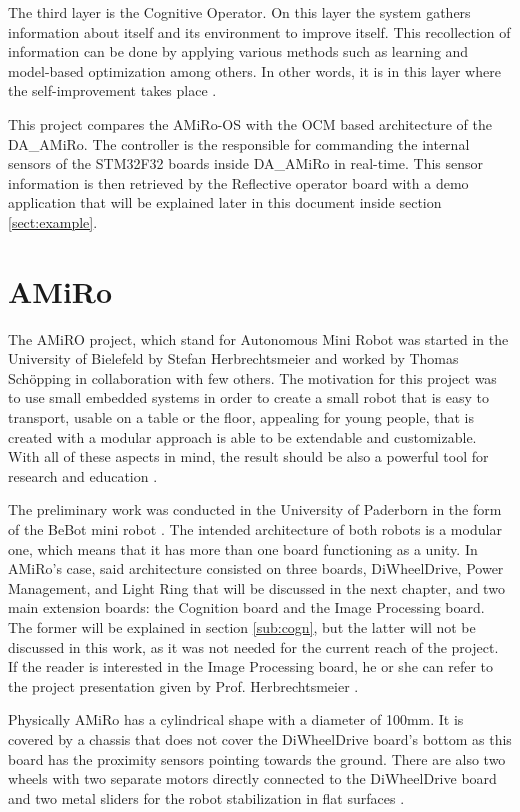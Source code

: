 \documentclass[12pt]{report}%
\begin{document}
The third layer is the Cognitive Operator. On this layer the system gathers information about itself and its environment to improve itself. This recollection of information can be done by applying various methods such as learning and model-based optimization among others. In other words, it is in this layer where the self-improvement takes place \cite{ocmAuto}.

This project compares the AMiRo-OS with the OCM based architecture of the DA\_AMiRo. The controller is the responsible for commanding the internal sensors of the STM32F32 boards inside DA\_AMiRo in real-time. This sensor information is then retrieved by the Reflective operator board with a demo application that will be explained later in this document inside section \ref{sect:example}.

\section{AMiRo}
The AMiRO project, which stand for Autonomous Mini Robot was started in the University of Bielefeld by Stefan Herbrechtsmeier and worked by Thomas Schöpping in collaboration with few others. The motivation for this project was to use small embedded systems in order to create a small robot that is easy to transport, usable on a table or the floor, appealing for young people, that is created with a modular approach is able to be extendable and customizable. With all of these aspects in mind, the result should be also a powerful tool for research and education \cite{AMiRo_ppt_v1}.

The preliminary work was conducted in the University of Paderborn in the form of the BeBot mini robot \cite{AMiRo_ppt_v1}. The intended architecture of both robots is a modular one, which means that it has more than one board functioning as a unity. In AMiRo's case, said architecture consisted on three boards, DiWheelDrive, Power Management, and Light Ring that will be discussed in the next chapter, and two main extension boards: the Cognition board and the Image Processing board. The former will be explained in section \ref{sub:cogn}, but the latter will not be discussed in this work, as it was not needed for the current reach of the project. If the reader is interested in the Image Processing board, he or she can refer to the project presentation given by Prof. Herbrechtsmeier \cite{AMiRo_ppt_v2}.

Physically AMiRo has a cylindrical shape with a diameter of 100mm. It is covered by a chassis that does not cover the DiWheelDrive board's bottom as this board has the proximity sensors pointing towards the ground. There are also two wheels with two separate motors directly connected to the DiWheelDrive board and two metal sliders for the robot stabilization in flat surfaces \cite{AMiRo_paper_modular}.
\end{document}
